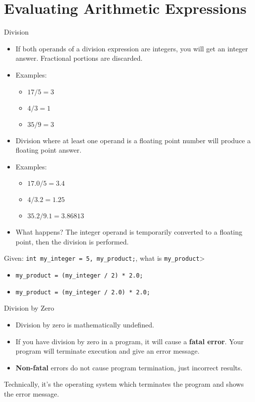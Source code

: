 \documentclass[graphics]{beamer}
\begin{document}
\section*{Evaluating Arithmetic Expressions}\label{sec:evalarithexp}
\begin{frame}{Division}
     {
        \begin{itemize}
            \item If both operands of a division expression are integers, you will get an integer answer. Fractional portions are discarded.
            \item Examples:
            \begin{itemize}
                \item $17/5 = 3$
                \item $4/3 = 1$
                \item $35/9 = 3$
            \end{itemize}
        \end{itemize}
    }
     {
        \begin{itemize}
            \item Division where at least one operand is a floating point number will produce a floating point answer.
            \item Examples:
            \begin{itemize}
                \item $17.0 / 5 = 3.4$
                \item $4/3.2 = 1.25$
                \item $35.2/9.1 = 3.86813$
            \end{itemize}
            \item What happens? The integer operand is temporarily converted to a floating point, then the division is performed.
        \end{itemize}
    }
     {
        Given: \texttt{int my\_integer = 5, my\_product;}, what is \texttt{my\_product}>
        \begin{itemize}
            \item \texttt{my\_product = (my\_integer / 2) * 2.0;}
            \item \texttt{my\_product = (my\_integer / 2.0) * 2.0;}
        \end{itemize}
    }
\end{frame}


\begin{frame}{Division by Zero}
    \begin{itemize}
        \item Division by zero is mathematically undefined.
        \item If you have division by zero in a program, it will cause a \textbf{fatal error}. Your program will terminate execution and give an error message.
        \item \textbf{Non-fatal} errors do not cause program termination, just incorrect results.
    \end{itemize}
    
    \vfill
    \footnotesize{Technically, it's the operating system which terminates the program and shows the error message.}
\end{frame}
\end{document}
